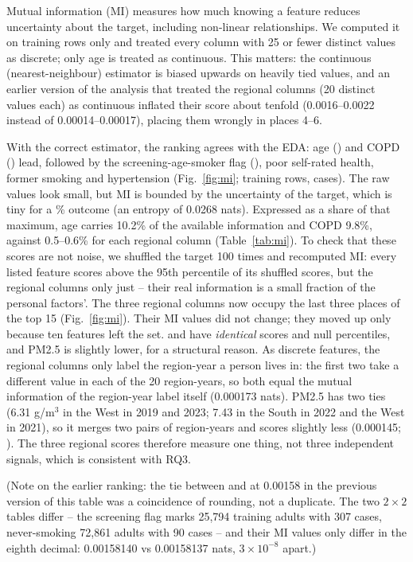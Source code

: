 Mutual information (MI) measures how much knowing a feature reduces uncertainty about the target, including non-linear relationships. We computed it on training rows only and treated every column with 25 or fewer distinct values as discrete; only age is treated as continuous. This matters: the continuous (nearest-neighbour) estimator is biased upwards on heavily tied values, and an earlier version of the analysis that treated the regional columns (20 distinct values each) as continuous inflated their score about tenfold (0.0016--0.0022 instead of 0.00014--0.00017), placing them wrongly in places 4--6.

With the correct estimator, the ranking agrees with the EDA: age (\miAge) and COPD (\miCOPD) lead, followed by the screening-age-smoker flag (\miScreening), poor self-rated health, former smoking and hypertension (Fig.~\ref{fig:mi}; \nTrain training rows, \nTrainCases cases). The raw values look small, but MI is bounded by the uncertainty of the target, which is tiny for a \sampleRate\% outcome (an entropy of 0.0268 nats). Expressed as a share of that maximum, age carries 10.2\% of the available information and COPD 9.8\%, against 0.5--0.6\% for each regional column (Table~\ref{tab:mi}). To check that these scores are not noise, we shuffled the target 100 times and recomputed MI: every listed feature scores above the 95th percentile of its shuffled scores, but the regional columns only just -- their real information is a small fraction of the personal factors'. The three regional columns now occupy the last three places of the top 15 (Fig.~\ref{fig:mi}). Their MI values did not change; they moved up only because ten features left the set.  and  have \emph{identical} scores and null percentiles, and PM2.5 is slightly lower, for a structural reason. As discrete features, the regional columns only label the region-year a person lives in: the first two take a different value in each of the 20 region-years, so both equal the mutual information of the region-year label itself (0.000173 nats). PM2.5 has two ties (6.31 \textmu g/m$^3$ in the West in 2019 and 2023; 7.43 in the South in 2022 and the West in 2021), so it merges two pairs of region-years and scores slightly less (0.000145; ). The three regional scores therefore measure one thing, not three independent signals, which is consistent with RQ3.

(Note on the earlier ranking: the tie between  and  at 0.00158 in the previous version of this table was a coincidence of rounding, not a duplicate. The two $2 \times 2$ tables differ -- the screening flag marks 25,794 training adults with 307 cases, never-smoking 72,861 adults with 90 cases -- and their MI values only differ in the eighth decimal: 0.00158140 vs 0.00158137 nats, $3 \times 10^{-8}$ apart.)

